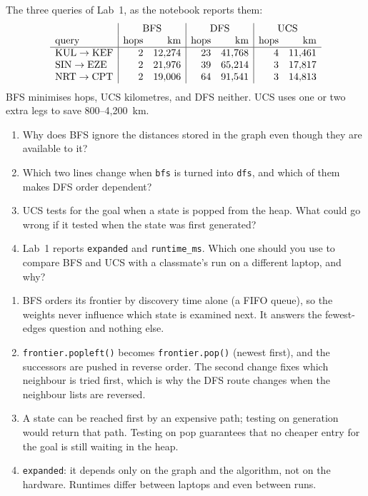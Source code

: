 \begin{workedexample}
The three queries of Lab~1, as the notebook reports them:
\[
\begin{array}{l|rr|rr|rr}
 & \multicolumn{2}{c|}{\text{BFS}} & \multicolumn{2}{c|}{\text{DFS}} & \multicolumn{2}{c}{\text{UCS}} \\
\text{query} & \text{hops} & \text{km} & \text{hops} & \text{km} & \text{hops} & \text{km} \\
\hline
\text{KUL}\to\text{KEF} & 2 & 12{,}274 & 23 & 41{,}768 & 4 & 11{,}461 \\
\text{SIN}\to\text{EZE} & 2 & 21{,}976 & 39 & 65{,}214 & 3 & 17{,}817 \\
\text{NRT}\to\text{CPT} & 2 & 19{,}006 & 64 & 91{,}541 & 3 & 14{,}813
\end{array}
\]
BFS minimises hops, UCS kilometres, and DFS neither. UCS uses one or two extra legs to save 800--4,200~km.
\end{workedexample}



\begin{quickcheck}
\begin{enumerate}
  \item Why does BFS ignore the distances stored in the graph even though they are available to it?
  \item Which two lines change when \texttt{bfs} is turned into \texttt{dfs}, and which of them makes DFS order dependent?
  \item UCS tests for the goal when a state is popped from the heap. What could go wrong if it tested when the state was first generated?
  \item Lab~1 reports \texttt{expanded} and \texttt{runtime\_ms}. Which one should you use to compare BFS and UCS with a classmate's run on a different laptop, and why?
\end{enumerate}
\end{quickcheck}

\begin{checkanswers}
\begin{enumerate}
  \item BFS orders its frontier by discovery time alone (a FIFO queue), so the weights never influence which state is examined next. It answers the fewest-edges question and nothing else.
  \item \texttt{frontier.popleft()} becomes \texttt{frontier.pop()} (newest first), and the successors are pushed in reverse order. The second change fixes which neighbour is tried first, which is why the DFS route changes when the neighbour lists are reversed.
  \item A state can be reached first by an expensive path; testing on generation would return that path. Testing on pop guarantees that no cheaper entry for the goal is still waiting in the heap.
  \item \texttt{expanded}: it depends only on the graph and the algorithm, not on the hardware. Runtimes differ between laptops and even between runs.
\end{enumerate}
\end{checkanswers}
